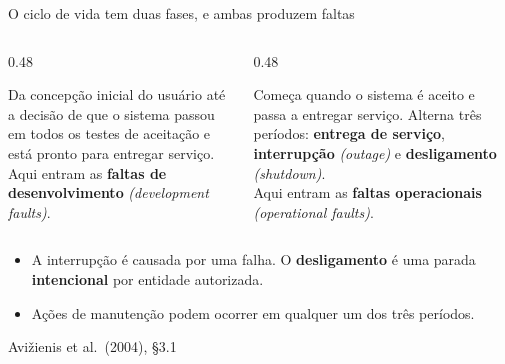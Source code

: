 \documentclass{beamer}
\newcommand{\en}[1]{{\color{depCinza}\textit{#1}}}
\newcommand{\sect}[1]{\par\smallskip\hfill{\tiny\color{black!55}Avi\v{z}ienis et al.\ (2004), #1}}
\begin{document}
\begin{frame}{O ciclo de vida tem duas fases, e ambas produzem faltas}
    \footnotesize
    \begin{columns}[T]
        \begin{column}{0.48\textwidth}
            \begin{tcolorbox}[colback=depAzul!6,colframe=depAzul!60,boxrule=0.6pt,title={\scriptsize\bfseries Fase de desenvolvimento}]
                \scriptsize
                Da concep\c{c}\~ao inicial do usu\'ario at\'e a decis\~ao de que o sistema passou em todos os testes de aceita\c{c}\~ao e est\'a pronto para entregar servi\c{c}o.\\[3pt]
                Aqui entram as \textbf{faltas de desenvolvimento} \en{(development faults)}.
            \end{tcolorbox}
        \end{column}
        \begin{column}{0.48\textwidth}
            \begin{tcolorbox}[colback=depVerde!6,colframe=depVerde!60,boxrule=0.6pt,title={\scriptsize\bfseries Fase de uso}]
                \scriptsize
                Come\c{c}a quando o sistema \'e aceito e passa a entregar servi\c{c}o. Alterna tr\^es per\'iodos: \textbf{entrega de servi\c{c}o}, \textbf{interrup\c{c}\~ao} \en{(outage)} e \textbf{desligamento} \en{(shutdown)}.\\[3pt]
                Aqui entram as \textbf{faltas operacionais} \en{(operational faults)}.
            \end{tcolorbox}
        \end{column}
    \end{columns}
    \medskip
    \begin{itemize}
        \item A interrup\c{c}\~ao \'e causada por uma falha. O \textbf{desligamento} \'e uma parada \textbf{intencional} por entidade autorizada.
        \item A\c{c}\~oes de manuten\c{c}\~ao podem ocorrer em qualquer um dos tr\^es per\'iodos.
    \end{itemize}
    \sect{\S3.1}
\end{frame}
\end{document}
